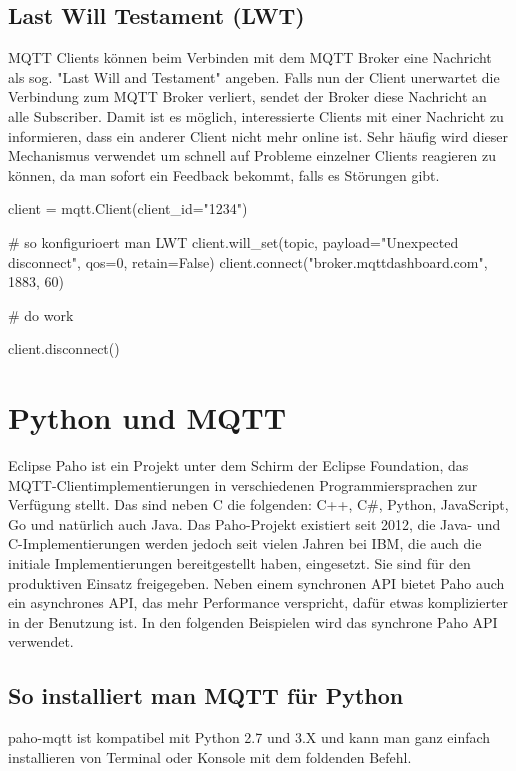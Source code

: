\subsection{Last Will Testament (LWT)}

MQTT Clients können beim Verbinden mit dem MQTT Broker eine Nachricht als sog. "Last Will and Testament" angeben. Falls nun der Client unerwartet die Verbindung zum MQTT Broker verliert, sendet der Broker diese Nachricht an alle Subscriber. Damit ist es möglich, interessierte Clients mit einer Nachricht zu informieren, dass ein anderer Client nicht mehr online ist. Sehr häufig wird dieser Mechanismus verwendet um schnell auf Probleme einzelner Clients reagieren zu können, da man sofort ein Feedback bekommt, falls es Störungen gibt.

\begin{python}
client = mqtt.Client(client_id="1234")

# so konfigurioert man LWT
client.will_set(topic, payload="Unexpected disconnect", qos=0,
retain=False)
client.connect("broker.mqttdashboard.com", 1883, 60)

# do work

client.disconnect()
\end{python}

\section{Python und MQTT}
Eclipse Paho ist ein Projekt unter dem Schirm der Eclipse Foundation, das MQTT-Clientimplementierungen in verschiedenen Programmiersprachen zur Verfügung stellt. Das sind neben C die folgenden: C++, C\#, Python, JavaScript, Go und natürlich auch Java. Das Paho-Projekt existiert seit 2012, die Java- und C-Implementierungen werden jedoch seit vielen Jahren bei IBM, die auch die initiale Implementierungen bereitgestellt haben, eingesetzt. Sie sind für den produktiven Einsatz freigegeben. Neben einem synchronen API bietet Paho auch ein asynchrones API, das mehr Performance verspricht, dafür etwas komplizierter in der Benutzung ist. In den folgenden Beispielen wird das synchrone Paho API verwendet.

\subsection{So installiert man MQTT für Python}
paho-mqtt ist kompatibel mit Python 2.7 und 3.X und kann man ganz einfach installieren von Terminal oder Konsole mit dem foldenden Befehl.

